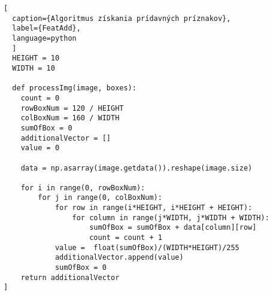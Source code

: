 \begin{lstlisting}[
  caption={Algoritmus získania prídavných príznakov},
  label={FeatAdd},
  language=python
  ]
  HEIGHT = 10 
  WIDTH = 10
  
  def processImg(image, boxes):
    count = 0
    rowBoxNum = 120 / HEIGHT
    colBoxNum = 160 / WIDTH
    sumOfBox = 0
    additionalVector = []
    value = 0
        
    data = np.asarray(image.getdata()).reshape(image.size)
    
    for i in range(0, rowBoxNum):
        for j in range(0, colBoxNum):
            for row in range(i*HEIGHT, i*HEIGHT + HEIGHT):
                for column in range(j*WIDTH, j*WIDTH + WIDTH):
                    sumOfBox = sumOfBox + data[column][row] 
                    count = count + 1
            value =  float(sumOfBox)/(WIDTH*HEIGHT)/255
            additionalVector.append(value)
            sumOfBox = 0
    return additionalVector
]

\end{lstlisting}




